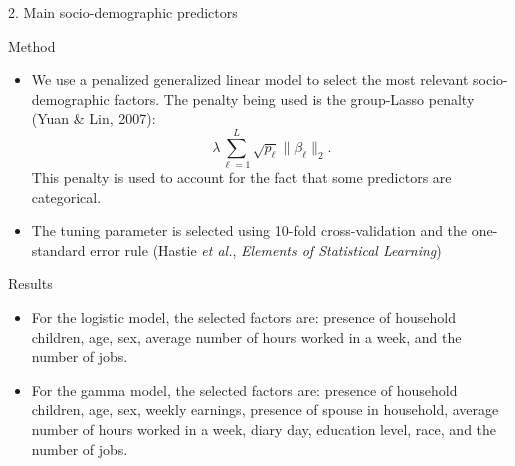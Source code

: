 \documentclass[final]{beamer}
\newcounter{acolumn}%
\def\autoheight{\vspace*{0pt}}%
\begin{document}
\begin{frame}
\begin{acolumns}[t]
\begin{column}{.64\linewidth}
                     
    \end{column}
              
    
    \begin{column}{.32\linewidth}
    \begin{center}
    	\LARGE{2. Main socio-demographic predictors}
    \end{center}
     \begin{block}{Method}
     	\begin{itemize}
     		\item We use a penalized generalized linear model to select the most relevant socio-demographic factors. The penalty being used is the group-Lasso penalty (Yuan \& Lin, 2007):
     		$$\lambda \sum_{\ell=1}^{L}\sqrt{p_\ell}\|\beta_\ell\|_2.$$
     		This penalty is used to account for the fact that some predictors are categorical.
     		\item The tuning parameter is selected using 10-fold cross-validation and the one-standard error rule (Hastie \emph{et al.}, \emph{Elements of Statistical Learning})
     	\end{itemize}
        
                     
     \end{block}
          
          
     \begin{block}{Results}
        \begin{itemize}
        	\item For the logistic model, the selected factors are: presence of household children, age, sex, average number of hours worked in a week, and the number of jobs.
        	
        	\item For the gamma model, the selected factors are: presence of household children, age, sex, weekly earnings, presence of spouse in household, average number of hours worked in a week, diary day, education level, race, and the number of jobs.
        \end{itemize}
       \autoheight                   
     \end{block}
     
        
    \end{column}
    
    
    \end{acolumns}
    
    \vfill
    
        \begin{acolumns}[t]
        

\end{acolumns}
\end{frame}
\end{document}
